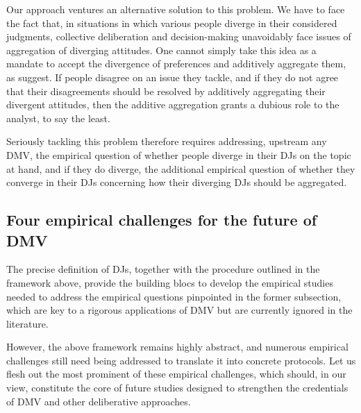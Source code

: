 \documentclass[version=3.21, pagesize, twoside=off, bibliography=totoc, DIV=calc, fontsize=12pt, a4paper, french, english]{scrartcl}
\begin{document}
Our approach ventures an alternative solution to this problem. We have to face the fact that, in situations in which various people diverge in their considered judgments, collective deliberation and decision-making unavoidably face issues of aggregation of diverging attitudes. 
One cannot simply take this idea as a mandate to accept the divergence of preferences and additively aggregate them, as \citet{bartkowski_beyond_2018} suggest. If people disagree on an issue they tackle, and if they do not agree that their disagreements should be resolved by additively aggregating their divergent attitudes, then the additive aggregation grants a dubious role to the analyst, to say the least.

Seriously tackling this problem therefore requires addressing, upstream any DMV, the empirical question of whether people diverge in their \acp{DJ} on the topic at hand, and if they do diverge, the additional empirical question of whether they converge in their \acp{DJ} concerning how their diverging \acp{DJ} should be aggregated. 

\subsection{Four empirical challenges for the future of DMV}
The precise definition of \acp{DJ}, together with the procedure outlined in the framework above, provide the building blocs to develop the empirical studies needed to address the empirical questions pinpointed in the former subsection, which are key to a rigorous applications of DMV but are currently ignored in the literature.


However, the above framework remains highly abstract, and numerous empirical challenges still need being addressed to translate it into concrete protocols. Let us flesh out the most prominent of these empirical challenges, which should, in our view, constitute the core of future studies designed to strengthen the credentials of DMV and other deliberative approaches. 
\end{document}
